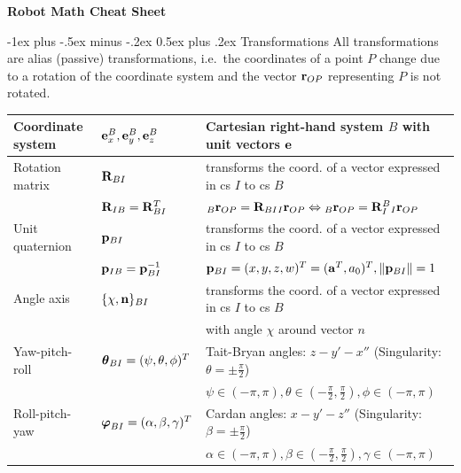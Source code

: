 \documentclass[10pt,landscape,a4paper]{article}
\makeatletter
\renewcommand{\section}{\@startsection{section}{1}{0mm}%
                                {-1ex plus -.5ex minus -.2ex}%
                                {0.5ex plus .2ex}%
                                {\normalfont\large\bfseries}}
\makeatother
\begin{document}
\raggedright
\footnotesize
\begin{multicols}{2}


\setlength{\premulticols}{1pt}
\setlength{\postmulticols}{1pt}
\setlength{\multicolsep}{1pt}
\setlength{\columnsep}{2pt}

\begin{center}
     \Large{\textbf{Robot Math Cheat Sheet}} \\
\end{center}
\section{Transformations}
All transformations are alias (passive) transformations, i.e.\ the coordinates of a point $P$ change due to a rotation of the coordinate system and the vector $\mathbf r_{OP}$ representing $P$ is not rotated.
\begin{tabular}{|l|l|l|}
\hline
Coordinate system & ${\mathbf e_x^B,\mathbf e_y^B,\mathbf e_z^B }$ & Cartesian right-hand system $B$ with unit vectors $\mathbf e$  \\ \hline
Rotation matrix & $\mathbf R_{BI}$ & transforms the coord. of a vector expressed in cs $I$ to cs $B$ \\ 
& $\mathbf R_{IB} = \mathbf R_{BI}^T$ & ${}_{B}\mathbf r_{OP} = \mathbf R_{BI} {}_{I}\mathbf r_{OP} \Leftrightarrow  {}_{B}\mathbf r_{OP} = \mathbf R_{I}^{B} {}_{I}\mathbf r_{OP}$ \\ \hline
Unit quaternion & $\mathbf p_{BI}$ &  transforms the coord. of a vector expressed in cs $I$ to cs $B$ \\
 & $\mathbf p_{IB} = \mathbf p_{BI}^{-1}$ & $\mathbf p_{BI}=(x,y,z,w)^T=(\mathbf a^T, a_0)^T, \left\lVert\mathbf p_{BI}\right\rVert=1$\\ \hline
Angle axis & $\{\chi, \mathbf n\}_{BI}$ & transforms the coord. of a vector expressed in cs $I$ to cs $B$  \\
& & with angle $\chi$ around vector $n$ \\ \hline
Yaw-pitch-roll &  $\mbox{\boldmath $\theta$}_{BI}=(\psi, \theta, \phi)^T$  & Tait-Bryan angles: $z-y'-x''$ (Singularity: $\theta=\pm\frac{\pi}{2}$) \\
 & & $\psi\in(-\pi,\pi), \theta\in(-\frac{\pi}{2},\frac{\pi}{2}), \phi\in(-\pi,\pi)$  \\  \hline
Roll-pitch-yaw &  $\mbox{\boldmath $\varphi$}_{BI}=(\alpha, \beta, \gamma)^T$ & Cardan angles: $x-y'-z''$ (Singularity: $\beta=\pm\frac{\pi}{2}$)  \\
 & & $\alpha\in(-\pi,\pi), \beta\in(-\frac{\pi}{2},\frac{\pi}{2}), \gamma\in(-\pi,\pi)$  \\  \hline
\end{tabular}




\end{multicols}
\end{document}
